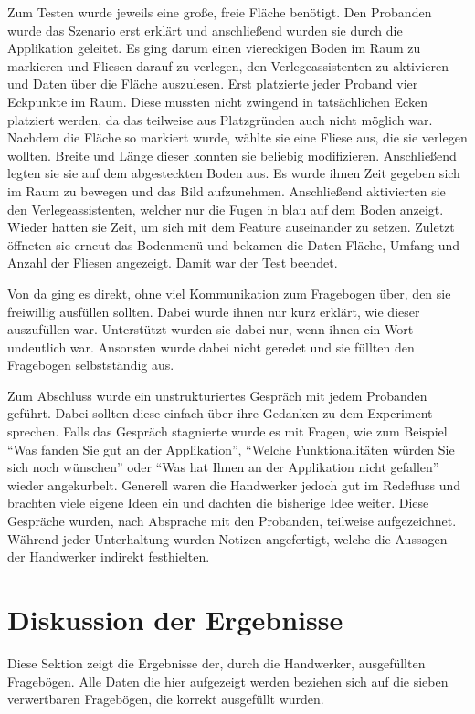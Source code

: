 Zum Testen wurde jeweils eine große, freie Fläche benötigt. Den Probanden wurde das Szenario erst erklärt und anschließend wurden sie durch die Applikation geleitet. Es ging darum einen viereckigen Boden im Raum zu markieren und Fliesen darauf zu verlegen, den Verlegeassistenten zu aktivieren und Daten über die Fläche auszulesen. Erst platzierte jeder Proband vier Eckpunkte im Raum. Diese mussten nicht zwingend in tatsächlichen Ecken platziert werden, da das teilweise aus Platzgründen auch nicht möglich war. Nachdem die Fläche so markiert wurde, wählte sie eine Fliese aus, die sie verlegen wollten. Breite und Länge dieser konnten sie beliebig modifizieren. Anschließend legten sie sie auf dem abgesteckten Boden aus. Es wurde ihnen Zeit gegeben sich im Raum zu bewegen und das Bild aufzunehmen. Anschließend aktivierten sie den Verlegeassistenten, welcher nur die Fugen in blau auf dem Boden anzeigt. Wieder hatten sie Zeit, um sich mit dem Feature auseinander zu setzen. Zuletzt öffneten sie erneut das Bodenmenü und bekamen die Daten Fläche, Umfang und Anzahl der Fliesen angezeigt. Damit war der Test beendet.

Von da ging es direkt, ohne viel Kommunikation zum Fragebogen über, den sie freiwillig ausfüllen sollten. Dabei wurde ihnen nur kurz erklärt, wie dieser auszufüllen war. Unterstützt wurden sie dabei nur, wenn ihnen ein Wort undeutlich war. Ansonsten wurde dabei nicht geredet und sie füllten den Fragebogen selbstständig aus.

Zum Abschluss wurde ein unstrukturiertes Gespräch mit jedem Probanden geführt. Dabei sollten diese einfach über ihre Gedanken zu dem Experiment sprechen. Falls das Gespräch stagnierte wurde es mit Fragen, wie zum Beispiel \enquote{Was fanden Sie gut an der Applikation}, \enquote{Welche Funktionalitäten würden Sie sich noch wünschen} oder \enquote{Was hat Ihnen an der Applikation nicht gefallen} wieder angekurbelt. Generell waren die Handwerker jedoch gut im Redefluss und brachten viele eigene Ideen ein und dachten die bisherige Idee weiter. Diese Gespräche wurden, nach Absprache mit den Probanden, teilweise aufgezeichnet. Während jeder Unterhaltung wurden Notizen angefertigt, welche die Aussagen der Handwerker indirekt festhielten.

\section{Diskussion der Ergebnisse}

Diese Sektion zeigt die Ergebnisse der, durch die Handwerker, ausgefüllten Fragebögen. Alle Daten die hier aufgezeigt werden beziehen sich auf die sieben verwertbaren Fragebögen, die korrekt ausgefüllt wurden. 

